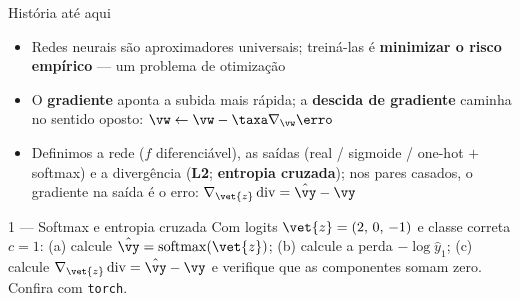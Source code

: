 \documentclass[aspectratio=169, 11pt]{beamer}
\begin{document}
\begin{frame}{História até aqui}
  \begin{itemize}\setlength{\itemsep}{0.4ex}
    \item Redes neurais são aproximadores universais; treiná-las é
          \textbf{minimizar o risco empírico} — um problema de otimização
    \item O \textbf{gradiente} aponta a subida mais rápida; a
          \textbf{descida de gradiente} caminha no sentido oposto:
          $\vw \leftarrow \vw - \taxa \nabla_{\vw} \erro$
    \item Definimos a rede ($f$ diferenciável), as saídas (real / sigmoide /
          one-hot $+$ softmax) e a divergência (\textbf{L2}; \textbf{entropia
          cruzada}); nos pares casados, o gradiente na saída é o erro:
          $\nabla_{\vet{z}}\, \mathrm{div} = \hat{\vy} - \vy$
  \end{itemize}

  \begin{exbox}{1 — Softmax e entropia cruzada}
    Com logits $\vet{z} = (2,\, 0,\, -1)$ e classe correta $c = 1$:
    (a) calcule $\hat{\vy} = \mathrm{softmax}(\vet{z})$;
    (b) calcule a perda $-\log \hat{y}_1$;
    (c) calcule $\nabla_{\vet{z}}\,\mathrm{div} = \hat{\vy} - \vy$ e verifique
    que as componentes somam zero. Confira com \texttt{torch}.
  \end{exbox}

  \medskip
\end{frame}
\end{document}
